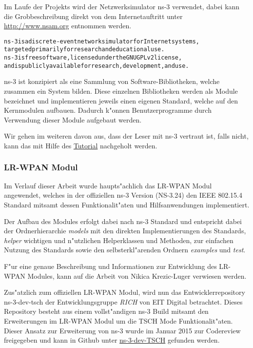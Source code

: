 Im Laufe der Projekts wird der Netzwerksimulator ns-3 verwendet, dabei
kann die Grobbeschreibung direkt von dem Internetauftritt unter
\href{http://www.nsam.org}{http://www.nsam.org} entnommen werden.

\begin{alltt}
ns-3 is a discrete-event network simulator for Internet systems,
targeted primarily for research and educational use.
ns-3 is free software, licensed under the GNU GPLv2 license,
and is publicly available for research, development, and use.
\end{alltt}

ns-3 ist konzipiert als eine Sammlung von Software-Bibliotheken, welche zusammen
ein System bilden. Diese einzelnen Bibliotheken werden als Module bezeichnet
und implementieren jeweils einen eigenen Standard, welche auf den Kernmodulen
aufbauen. Dadurch k"onnen Benutzerprogramme durch Verwendung dieser Module
aufgebaut werden.

Wir gehen im weiteren davon aus, dass der Leser mit ns-3 vertraut ist,
falls nicht, kann das mit Hilfe des \href{https://www.nsnam.org/ns-3-24/documentation/}{Tutorial}
nachgeholt werden.

\subsubsection{LR-WPAN Modul}

Im Verlauf dieser Arbeit wurde haupts"achlich das LR-WPAN Modul angewendet, welches
in der offiziellen ns-3 Version (NS-3.24) den IEEE 802.15.4 Standard mitsamt
dessen Funktionalit"aten und Hilfsanwendungen implementiert.

Der Aufbau des Modules erfolgt dabei nach ns-3 Standard und entspricht dabei der
Ordnerhierarchie \textit{models} mit den direkten Implementierungen des Standards,
\textit{helper} wichtigen und n"utzlichen Helperklassen und Methoden, zur einfachen
Nutzung des Standards sowie den selbsterkl"arenden Ordnern \textit{examples} und
\textit{test}.

F"ur eine genaue Beschreibung und Informationen zur Entwicklung des LR-WPAN Modules,
kann auf die Arbeit von Nikica Krezic-Luger\cite{bachelorarbeit} verwiesen werden.

Zus"atzlich zum offiziellen LR-WPAN Modul, wird nun das Entwicklerrepository ns-3-dev-tsch
der Entwicklungsgruppe \textit{RICH} von EIT Digital betrachtet. Dieses Repository
besteht aus einem vollst"andigen ns-3 Build mitsamt den Erweiterungen im LR-WPAN
Modul um die TSCH Mode Funktionalit"aten. Dieser Ansatz zur Erweiterung von ns-3
wurde im Januar 2015 zur Codereview freigegeben und kann in Github unter
\href{https://github.com/EIT-ICT-RICH/ns-3-dev-TSCH}{ns-3-dev-TSCH}
gefunden werden.

